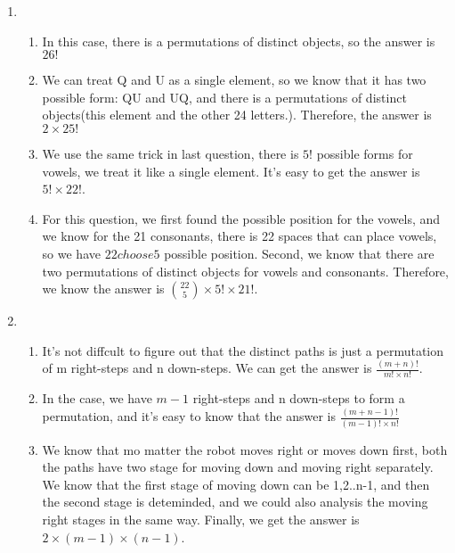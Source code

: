 \documentclass{article}
\begin{document}
\begin{enumerate}
	\item %
	\begin{enumerate}
	\item In this case, there is a permutations of distinct objects, so the answer is $26!$
	\item We can treat Q and U as a single element, so we know that it has two possible form: QU and UQ, and there is a permutations of distinct objects(this element and the other 24 letters.). Therefore, the answer is $2\times25!$
	\item We use the same trick in last question, there is $5!$ possible forms for vowels, we treat it like a single element. It's easy to get the answer is $5!\times22!$.
	\item For this question, we first found the possible position for the vowels, and we know for the 21 consonants, there is 22 spaces that can place vowels, so we have ${22 choose 5}$ possible position. Second, we know that there are two permutations of distinct objects for vowels and consonants. Therefore, we know the answer is ${22 \choose 5}\times5!\times21!$.
	\end{enumerate}
	
	\item 
	\begin{enumerate}
	\item It's not diffcult to figure out that the distinct paths is just a permutation of m right-steps and n down-steps. We can get the answer is $\frac{(m+n)!}{m!\times n!}$.
	\item In the case, we have $m-1$ right-steps and n down-steps to form a permutation, and it's easy to know that the answer is $\frac{(m+n-1)!}{(m-1)!\times n!}$
	\item We know that mo matter the robot moves right or moves down first, both the paths have two stage for moving down and moving right separately. We know that the first stage of moving down can be 1,2..n-1, and then the second stage is deteminded, and we could also analysis the moving right stages in the same way. Finally, we get the answer is $2\times(m-1)\times(n-1)$.
	\end{enumerate}
	

\end{enumerate}
\end{document}
